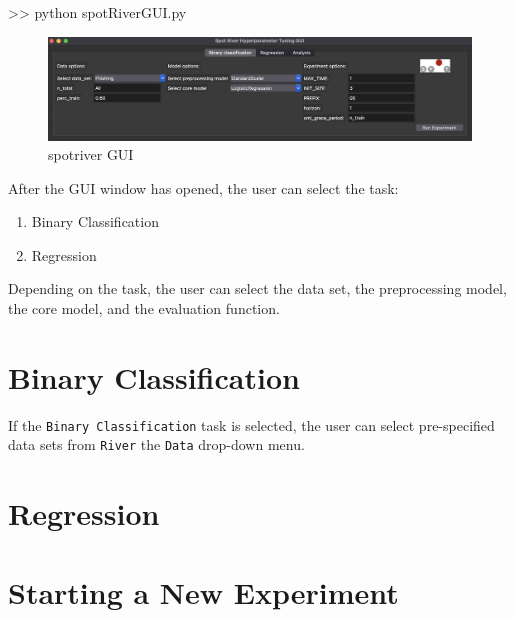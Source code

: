 \documentclass[
  letterpaper,
  DIV=11,
  numbers=noendperiod]{scrreprt}
\newenvironment{Shaded}{\begin{snugshade}}{\end{snugshade}}
\newcommand{\NormalTok}[1]{\textcolor[rgb]{0.00,0.23,0.31}{#1}}
\providecommand{\tightlist}{%
  \setlength{\itemsep}{0pt}\setlength{\parskip}{0pt}}\usepackage{longtable,booktabs,array}
\begin{document}
\begin{Shaded}
\begin{Highlighting}[]
\NormalTok{\textgreater{}\textgreater{} python spotRiverGUI.py}
\end{Highlighting}
\end{Shaded}

\begin{figure}[H]

{\centering \includegraphics{./figures_static/spotGUIstart01.png}

}

\caption{spotriver GUI}

\end{figure}%

After the GUI window has opened, the user can select the task:

\begin{enumerate}
\def\labelenumi{\arabic{enumi}.}
\tightlist
\item
  Binary Classification
\item
  Regression
\end{enumerate}

Depending on the task, the user can select the data set, the
preprocessing model, the core model, and the evaluation function.

\section{Binary Classification}\label{binary-classification}

If the \texttt{Binary\ Classification} task is selected, the user can
select pre-specified data sets from \texttt{River} the \texttt{Data}
drop-down menu.

\section{Regression}\label{regression}

\section{Starting a New Experiment}\label{starting-a-new-experiment}
\end{document}
